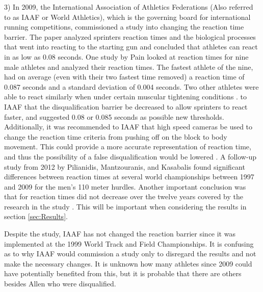 \documentclass[12pt, letterpaper, titlepage]{article}
\begin{document}
3)
In 2009, the International Association of Athletics Federations (Also referred to
as IAAF or World Athletics), which is the governing board for international running
competitions, commissioned a study into changing the reaction time barrier.
The paper analyzed sprinters reaction times and the biological processes 
that went into reacting to the starting gun and concluded 
that athletes can react in as low as 0.08 seconds.  One study by Pain looked at
reaction times for nine male athletes and analyzed their reaction times.  The
fastest athlete of the nine, had on average (even with their two fastest time 
removed) a reaction time of 0.087 seconds and a standard deviation of 0.004
seconds.  Two other athletes were able to react similarly when under certain
muscular tightening conditions \citep{pain2007sprint}.
to IAAF that the disqualification barrier be decreased to allow sprinters to
react faster, and suggested 0.08 or 0.085 seconds as possible new thresholds.
Additionally, it was recommended to IAAF that high speed cameras be used to
change the reaction time criteria from pushing off on the block to body movement.
This could provide a more accurate representation of reaction time, and thus the
possibility of a false disqualification would be lowered \citep{komi2009iaaf}.  
A follow-up study from 2012 by Pilianidis, Mantzouranis, and Kasabalis found
significant differences between reaction times at several world championships
between 1997 and 2009 for the men's 110 meter hurdles.  Another important
conclusion was that for reaction times did not decrease over the twelve years
covered by the research in the study \citep{pilianidis2012start}.  This will
be important when considering the results in section \ref{sec:Results}.


Despite the study, IAAF has not changed the reaction barrier since it was
implemented at the 1999 World Track and Field Championships.  It is confusing
as to why IAAF would commission a study only to disregard the results and not
make the necessary changes.  It is unknown how many athletes since 2009 could
have potentially benefited from this, but it is probable that there are others
besides Allen who were disqualified.
\end{document}
